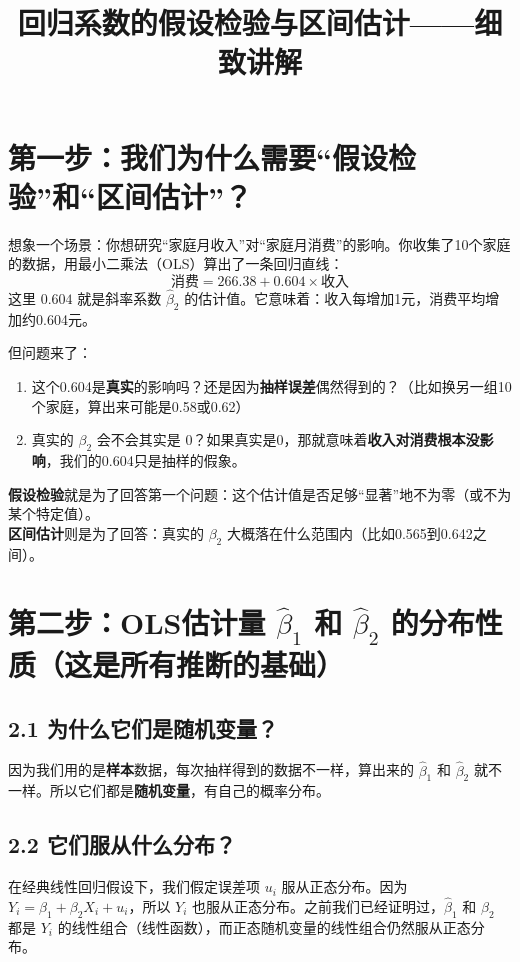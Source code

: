 \documentclass[12pt,a4paper]{ctexart}
\title{回归系数的假设检验与区间估计——细致讲解}
\author{}
\date{}
\begin{document}
\maketitle

\section*{第一步：我们为什么需要“假设检验”和“区间估计”？}

想象一个场景：你想研究“家庭月收入”对“家庭月消费”的影响。你收集了10个家庭的数据，用最小二乘法（OLS）算出了一条回归直线：
\[
\text{消费} = 266.38 + 0.604 \times \text{收入}
\]
这里 \(0.604\) 就是斜率系数 \(\hat{\beta}_2\) 的估计值。它意味着：收入每增加1元，消费平均增加约0.604元。

但问题来了：
\begin{enumerate}[label=\arabic*.]
    \item 这个0.604是\textbf{真实}的影响吗？还是因为\textbf{抽样误差}偶然得到的？（比如换另一组10个家庭，算出来可能是0.58或0.62）
    \item 真实的 \(\beta_2\) 会不会其实是 \(0\)？如果真实是0，那就意味着\textbf{收入对消费根本没影响}，我们的0.604只是抽样的假象。
\end{enumerate}

\textbf{假设检验}就是为了回答第一个问题：这个估计值是否足够“显著”地不为零（或不为某个特定值）。\\
\textbf{区间估计}则是为了回答：真实的 \(\beta_2\) 大概落在什么范围内（比如0.565到0.642之间）。

\section*{第二步：OLS估计量 \(\hat{\beta}_1\) 和 \(\hat{\beta}_2\) 的分布性质（这是所有推断的基础）}

\subsection*{2.1 为什么它们是随机变量？}
因为我们用的是\textbf{样本}数据，每次抽样得到的数据不一样，算出来的 \(\hat{\beta}_1\) 和 \(\hat{\beta}_2\) 就不一样。所以它们都是\textbf{随机变量}，有自己的概率分布。

\subsection*{2.2 它们服从什么分布？}
在经典线性回归假设下，我们假定误差项 \(u_i\) 服从正态分布。因为 \(Y_i = \beta_1 + \beta_2 X_i + u_i\)，所以 \(Y_i\) 也服从正态分布。之前我们已经证明过，\(\hat{\beta}_1\) 和 \(\hat{\beta}_2\) 都是 \(Y_i\) 的线性组合（线性函数），而正态随机变量的线性组合仍然服从正态分布。
\end{document}
